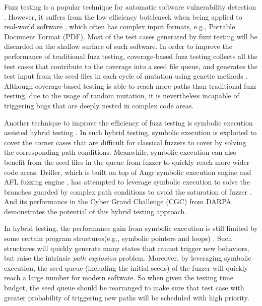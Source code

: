

Fuzz testing is a popular technique for automatic software vulnerability detection 
 \cite{Miller:Fuzz, 5010257, sutton2007fuzzing}.
 However, it suffers from the low efficiency bottleneck when being applied to real-world software 
 \cite{neystadt2008automated, godefroid2008automating, ganesh2009taint, cadar2011symbolic, rawat2017vuzzer, stephens2016driller},
  which often has complex input formats, e.g., Portable Document Format (PDF).
  Most of the test cases generated by fuzz testing will be discarded on the shallow surface of such software.
  In order to improve the performance of traditional fuzz testing, 
  coverage-based fuzz testing collects all the test cases that contribute to the coverage into a seed file queue,
  and generates the test input from the seed files in each cycle of mutation using genetic methods
  \cite{rawat2017vuzzer, online:afl, stephens2016driller}.
  Although coverage-based testing is able to reach more paths than traditional fuzz testing, 
  due to the usage of random mutation,
  it is nevertheless incapable of triggering bugs that are deeply nested in complex code areas.


Another technique to improve the efficiency of fuzz testing is symbolic execution assisted hybrid testing \cite{yeh2015craxfuzz, majumdar2007hybrid, pak2012hybrid}.
 In such hybrid testing, symbolic execution is exploited to cover the corner cases that are difficult for classical fuzzers to cover by solving the corresponding path conditions.
 Meanwhile, symbolic execution can also benefit from the seed files in the queue from fuzzer 
 to quickly reach more wider code areas. 
 Driller, which is built on top of Angr symbolic execution engine \cite{Shoshitaishvili_firmalice-automatic} and AFL fuzzing engine \cite{online:afl}, 
 has attempted to leverage symbolic execution to solve the branches guarded 
 by complex path conditions to avoid the saturation of fuzzer \cite{stephens2016driller}. 
 And its performance in the Cyber Grand Challenge (CGC) from DARPA \cite{online:CGC} demonstrates the potential of this hybrid testing approach.


In hybrid testing, the performance gain from symbolic execution is still limited 
 by some certain program structures(e.g., symbolic pointers and loops) \cite{schwartz2010all, Boonstoppel:RAP, cadar2011symbolic, baldoni2016survey}. 
 Such structures will quickly generate many states that cannot trigger new behaviors,
 but raise the intrinsic \textit{path explosion} problem.
 Moreover, by leveraging symbolic execution, 
 the seed queue (including the initial seeds) of the fuzzer will quickly reach a large number for modern software. 
 So when given the testing time budget, the seed queue should be rearranged to make sure 
 that test case with greater probability of triggering new paths will be scheduled with high priority.



